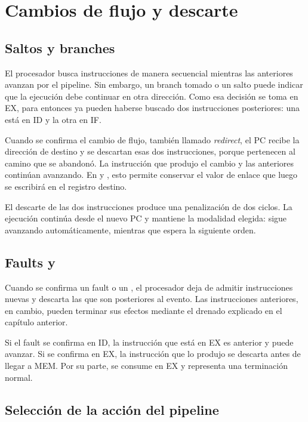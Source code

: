 \section{Cambios de flujo y descarte}

\subsection{Saltos y branches}

El procesador busca instrucciones de manera secuencial mientras las anteriores
avanzan por el pipeline. Sin embargo, un branch tomado o un salto puede indicar
que la ejecución debe continuar en otra dirección. Como esa decisión se toma
en EX, para entonces ya pueden haberse buscado dos instrucciones posteriores:
una está en ID y la otra en IF.

Cuando se confirma el cambio de flujo, también llamado \emph{redirect}, el PC
recibe la dirección de destino y se descartan esas dos instrucciones, porque
pertenecen al camino que se abandonó. La instrucción que produjo el cambio y
las anteriores continúan avanzando. En  y , esto permite
conservar el valor de enlace que luego se escribirá en el registro destino.

El descarte de las dos instrucciones produce una penalización de dos ciclos.
La ejecución continúa desde el nuevo PC y mantiene la modalidad elegida:
 sigue avanzando automáticamente, mientras que  espera la
siguiente orden.

\subsection{Faults y }

Cuando se confirma un fault o un , el procesador deja de admitir
instrucciones nuevas y descarta las que son posteriores al evento. Las
instrucciones anteriores, en cambio, pueden terminar sus efectos mediante el
drenado explicado en el capítulo anterior.

Si el fault se confirma en ID, la instrucción que está en EX es anterior y
puede avanzar. Si se confirma en EX, la instrucción que lo produjo se descarta
antes de llegar a MEM. Por su parte,  se consume en EX y representa
una terminación normal.

\subsection{Selección de la acción del pipeline}

